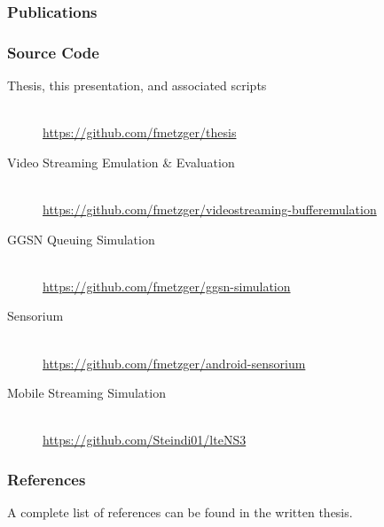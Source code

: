 \documentclass{beamer}
\begin{document}
\appendix
{}
\setcounter{finalframe}{\value{framenumber}}



\begin{frame}[t,allowframebreaks]
	\frametitle{Publications}

	\nocite{metzger2012research, metzger2014lossmodel,raf2013sensorium, cs3516, metzger2014jcnc, rafetseder2011explyt, 6229739, metzger2011delivery, cs3518, metzger2015ltesim}


	\printbibliography[category=ownpub, heading=none, title=none]

\end{frame}

\begin{frame}
	\frametitle{Source Code}

	\small\begin{description}
		\item[Thesis, this presentation, and associated scripts]\hfill \\
		\url{https://github.com/fmetzger/thesis}

		\item[Video Streaming Emulation \& Evaluation]\hfill \\
		\url{https://github.com/fmetzger/videostreaming-bufferemulation}

		\item[GGSN Queuing Simulation]\hfill \\
		\url{https://github.com/fmetzger/ggsn-simulation}

		\item[Sensorium]\hfill \\
		\url{https://github.com/fmetzger/android-sensorium}

		\item[Mobile Streaming Simulation]\hfill \\
		\url{https://github.com/Steindi01/lteNS3}
	\end{description}
\end{frame}

\begin{frame}[t,allowframebreaks]
	\frametitle{References}
	A complete list of references can be found in the written thesis.

	\printbibliography[notcategory=ownpub, heading=none, title=none]
\end{frame}
\end{document}
